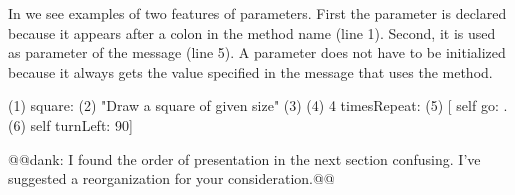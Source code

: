 \newcommand{\replace}[2]{Looking at}{In}  we see \newcommand{\replace}[2]{that:}{examples of two features of parameters.}
First\newcommand{\add}[1]{,} the parameter  is declared because it appears after
a colon in the method name (line 1). Second, it is used
as \newcommand{\add}[1]{the} parameter of the message \go (line 5). A parameter does not have to be initialized because it always gets the value specified \newcommand{\replace}[2]{by}{in} the message that uses the method.

\begin{method}\label{mth:squareArgumentsagain}
(1) square: 
(2)   "Draw a square of \newcommand{\add}[1]{the} given size"
(3)
(4)   4 timesRepeat: 
(5)                    [ self go: .
(6)                    self turnLeft: 90]
\end{method}
@@dank: I found the order of presentation in the next section confusing.  I've suggested a reorganization for your consideration.@@

